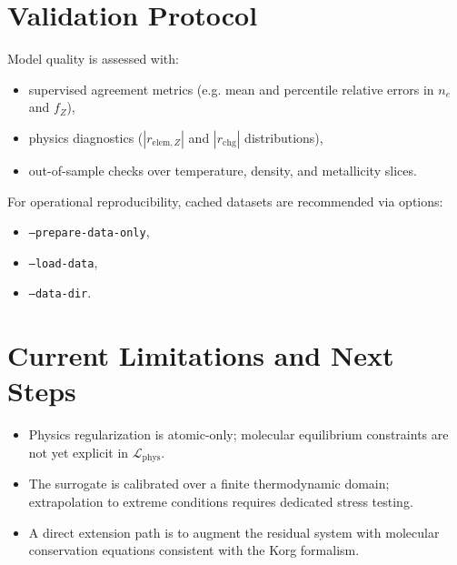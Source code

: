 \documentclass[11pt]{article}
\begin{document}
\section{Validation Protocol}
Model quality is assessed with:
\begin{itemize}[leftmargin=1.5em]
    \item supervised agreement metrics (e.g. mean and percentile relative errors in $n_e$ and $f_Z$),
    \item physics diagnostics ($|r_{\mathrm{elem},Z}|$ and $|r_{\mathrm{chg}}|$ distributions),
    \item out-of-sample checks over temperature, density, and metallicity slices.
\end{itemize}
For operational reproducibility, cached datasets are recommended via
 options:
\begin{itemize}[leftmargin=1.5em]
    \item \texttt{--prepare-data-only},
    \item \texttt{--load-data},
    \item \texttt{--data-dir}.
\end{itemize}

\section{Current Limitations and Next Steps}
\begin{itemize}[leftmargin=1.5em]
    \item Physics regularization is atomic-only; molecular equilibrium constraints are not yet explicit in $\mathcal{L}_{\mathrm{phys}}$.
    \item The surrogate is calibrated over a finite thermodynamic domain; extrapolation to extreme conditions requires dedicated stress testing.
    \item A direct extension path is to augment the residual system with molecular conservation equations consistent with the Korg formalism.
\end{itemize}
\end{document}
